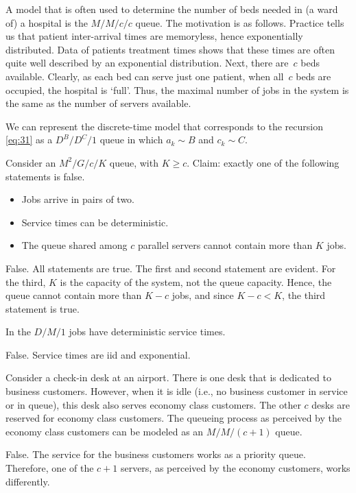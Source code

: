 \documentclass[stochastic-or.tex]{subfiles}
\begin{document}
A model that is often used to determine the number of beds needed in (a ward of) a hospital is the $M/M/c/c$ queue.
The motivation is as follows.
Practice tells us that patient inter-arrival times are memoryless, hence exponentially distributed.
Data of patients treatment times shows that these times are often quite well described by an exponential distribution.
Next, there are~$c$ beds available.
Clearly, as each bed can serve just one patient, when all~$c$ beds are occupied, the hospital is `full'.
Thus, the maximal number of jobs in the system is the same as the number of servers available.

We can represent the discrete-time model  that corresponds to the recursion \cref{eq:31} as a $D^{B}/D^{C}/1$ queue in which $a_{k}\sim B$ and $c_{k}\sim C$.


\begin{truefalse}
Consider an $M^2/G/c/K$ queue, with $K\geq c$.
Claim: exactly one of the following statements is false.
    \begin{itemize}
        \item Jobs arrive in pairs of two.
        \item Service times can be deterministic.
        \item The  queue shared among $c$ parallel servers cannot contain more than $K$ jobs.
    \end{itemize}
    \begin{solution}
    False.
All statements are true.
The first and second statement are evident.
For the third, $K$ is the capacity of the system, not the queue capacity.
Hence, the queue cannot contain more than $K-c$ jobs, and since $K-c < K$, the third statement is true.
\end{solution}
\end{truefalse}

\begin{truefalse}
In the $D/M/1$ jobs have deterministic service times.
\begin{solution}
False. Service times are iid and exponential.
\end{solution}
\end{truefalse}

\begin{truefalse}
Consider a check-in desk at an airport.
There is one desk that is dedicated to business customers.
However, when it is idle (i.e., no business customer in service or in queue), this desk also serves economy class customers.
The other $c$ desks are reserved for economy class customers.
The queueing process as perceived by the economy class customers can be modeled as an $M/M/(c+1)$ queue.
\begin{solution}
False. The service  for the business customers works as a priority queue. Therefore, one of the $c+1$ servers, as perceived by the economy customers, works differently.
\end{solution}
\end{truefalse}



\end{document}
